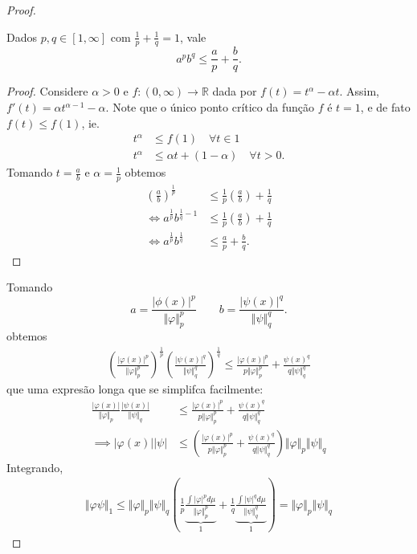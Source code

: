 \documentclass{article}
\theoremstyle{definition}
\numberwithin{equation}{section}
\newcommand{\R}{\mathbb{R}}
\begin{document}
	\begin{proof}
		\begin{claim}
			Dados $p,q\in[1,\infty]$ com $\frac{1}{p}+\frac{1}{q}=1$, vale
			\[a^pb^q\leq\frac{a}{p}+\frac{b}{q}.\]
		\end{claim}
		\begin{proof}
			Considere $\alpha>0$ e $f:(0,\infty)\to\R$ dada por $f(t)=t^\alpha-\alpha t$. Assim, $f'(t)=\alpha t^{\alpha-1}-\alpha$.  Note que o único ponto crítico da função $f$ é $t=1$, e de fato $f(t)\leq f(1)$, ie.
			\begin{align*}
				t^\alpha&\leq f(1)\quad\forall t\in1\\
				t^\alpha&\leq\alpha t+(1-\alpha)\quad\forall t>0.
			\end{align*}
			Tomando $t=\frac{a}{b}$ e $\alpha=\frac{1}{p}$ obtemos
			\begin{align*}
				\left(\frac{a}{b}\right)^{\frac{1}{p}}&\leq\frac{1}{p}\left(\frac{a}{b}\right)+\frac{1}{q}\\
				\iff a^{\frac{1}{p}}b^{\frac{1}{q}-1}&\leq\frac{1}{p}\left(\frac{a}{b}\right)+\frac{1}{q}\\
				\iff a^{\frac{1}{p}}b^{\frac{1}{q}}&\leq\frac{a}{p}+\frac{b}{q}.
			\end{align*}
		\end{proof}
		Tomando 
		\[a=\frac{|\phi(x)|^p}{\Vert\varphi\Vert^p_p}\qquad b=\frac{|\psi(x)|^q}{\Vert\psi\Vert^q_q}.\]
		obtemos
		\begin{align*}
			\left(\frac{|\varphi(x)|^p}{\Vert\varphi\Vert_p^p}\right)^\frac{1}{p}\left(\frac{|\psi(x)|^q}{\Vert\psi\Vert_q^q}\right)^\frac{1}{q}\leq\frac{|\varphi(x)|^p}{p\Vert \varphi\Vert^p_p}+\frac{\psi(x)^q}{q\Vert\psi\Vert_q^q}
		\end{align*}
		que uma expresão longa que se simplifca facilmente:
		\begin{align*}
			\frac{|\varphi(x)|}{\Vert\varphi\Vert_p}\frac{|\psi(x)|}{\Vert\psi\Vert_q}&\leq \frac{|\varphi(x)|^p}{p\Vert \varphi\Vert^p_p}+\frac{\psi(x)^q}{q\Vert\psi\Vert_q^q}\\
			\implies |\varphi(x)||\psi|&\leq\left(\frac{|\varphi(x)|^p}{p\Vert \varphi\Vert^p_p}+\frac{\psi(x)^q}{q\Vert\psi\Vert_q^q}\right)\Vert\varphi\Vert_p\Vert\psi\Vert_q
		\end{align*}
		Integrando,
		\begin{align*}
			\Vert\varphi\psi\Vert_1\leq\Vert\varphi\Vert_p\Vert\psi\Vert_q\left(\frac{1}{p}\underbrace{\frac{\int|\varphi|^pd\mu}{\Vert\varphi\Vert^p_p}}_1+\frac{1}{q}\underbrace{\frac{\int|\psi|^qd\mu}{\Vert\psi\Vert_q^q}}_1\right)=\Vert\varphi\Vert_p\Vert\psi\Vert_q
		\end{align*}
	\end{proof}
\end{document}
